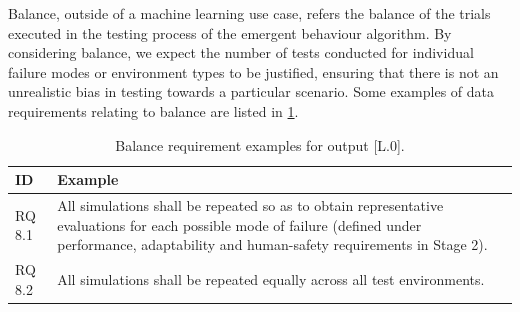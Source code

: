 \documentclass[lettersize,journal]{IEEEtran}
\begin{document}
Balance, outside of a machine learning use case, refers the balance of the trials executed in the testing process of the emergent behaviour algorithm. By considering balance, we expect the number of tests conducted for individual failure modes or environment types to be justified, ensuring that there is not an unrealistic bias in testing towards a particular scenario. Some examples of data requirements relating to balance are listed in \ref{tab:L0_balance}.

\begin{table}%
    \centering
    \begin{tabular}{p{1cm} p{6cm}}
        \textbf{ID} & \textbf{Example} \\
        \hline
        RQ 8.1 & All simulations shall be repeated so as to obtain representative evaluations for each possible mode of failure (defined under performance, adaptability and human-safety requirements in Stage 2).\\
        \hline
        RQ 8.2 & All simulations shall be repeated equally across all test environments.\\
        \hline
    \end{tabular}
    \caption{Balance requirement examples for output [L.0].}
    \label{tab:L0_balance}
\end{table}

\end{document}

